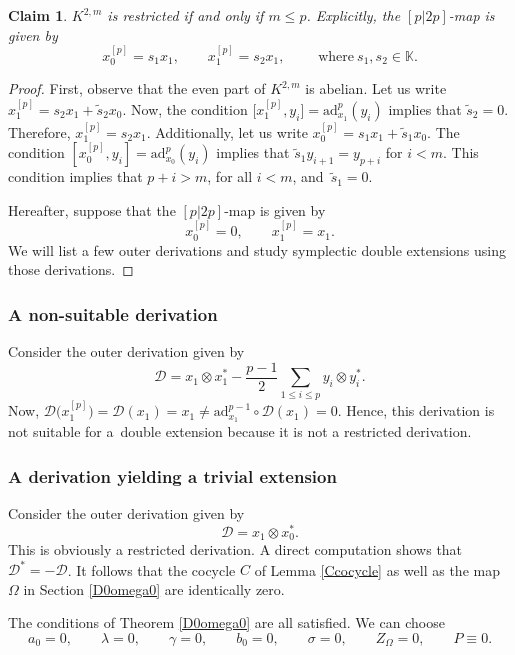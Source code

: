 \documentclass[10pt,a4paper]{amsart}
\numberwithin{equation}{section}
\newtheorem{Claim}[Theorem]{Claim}
\begin{document}
\begin{Claim}
 $K^{2,m}$ is restricted if and only if $m\leq p$. Explicitly, the $[p|2p]$-map is given by
\[
x_0^{[p]}=s_1 x_1, \qquad x_1^{[p]}=s_2 x_1, \qquad\text{ where}\ s_1, s_2\in \mathbb K.
\]
\end{Claim}
\begin{proof} First, observe that the even part of $K^{2,m}$ is abelian. Let us write ${x_1^{[p]}=s_2 x_1+ \tilde s_2 x_0}$. Now, the condition $\big[x_1^{[p]},y_i\big]=\mathrm{ad}_{x_1}^p(y_i)$ implies that $\tilde s_2=0$. Therefore, $x_1^{[p]}=s_2 x_1$. Additionally, let us write $x_0^{[p]}=s_1 x_1+ \tilde s_1 x_0$. The condition $[x_0^{[p]},y_i]=\mathrm{ad}_{x_0}^p(y_i)$ implies that $\tilde s_1 y_{i+1}=y_{p+i}$ for $i<m$. This condition implies that $p+i>m$, for all $i<m$, and~$\tilde s_1=0$.

Hereafter, suppose that the $[p|2p]$-map is given by
\[
x_0^{[p]}=0, \qquad x_1^{[p]}= x_1.
\]
We will list a few outer derivations and study symplectic double extensions using those derivations.
\end{proof}
\subsubsection{A non-suitable derivation}
Consider the outer derivation given by
\[
{\mathscr D}= x_1\otimes x_1^*-\frac{p-1}{2} \sum_{1\leq i \leq p} y_i \otimes y_i^*.
\]
Now, ${\mathscr D}\bigl(x_1^{[p]}\bigr)={\mathscr D}( x_1)= x_1\not = \mathrm{ad}_{x_1}^{p-1} \circ {\mathscr D}(x_1)=0.$ Hence, this derivation is not suitable for a~double extension because it is not a restricted derivation.

\subsubsection{A derivation yielding a trivial extension} Consider the outer derivation given by
\[
{\mathscr D}=x_1\otimes x_0^*.
\]
This is obviously a restricted derivation. A direct computation shows that ${\mathscr D}^*=-{\mathscr D}$. It follows that the cocycle $C$ of Lemma \ref{Ccocycle} as well as the map $\Omega$ in Section \ref{D0omega0} are identically zero.

The conditions of Theorem \ref{D0omega0} are all satisfied. We can choose
\[
a_0=0,\qquad \lambda=0,\qquad \gamma=0,\qquad b_0=0,\qquad \sigma=0,\qquad Z_\Omega=0, \qquad P\equiv 0.
\]
\end{document}
